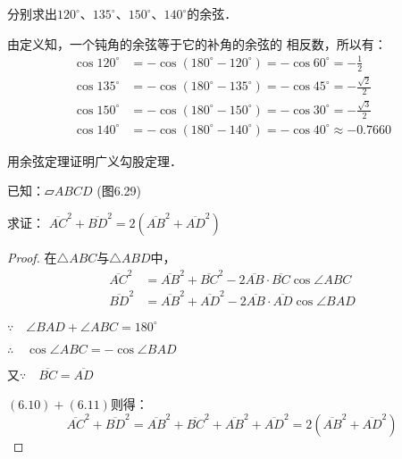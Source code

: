 \begin{example}
    分别求出$120^{\circ}$、$135^{\circ}$、$150^{\circ}$、$140^{\circ}$的余弦．
\end{example}

\begin{solution}
由定义知，一个钝角的余弦等于它的补角的余弦的
相反数，所以有：
\[\begin{split}
  \cos120^{\circ}&=-\cos(180^{\circ}-120^{\circ})=-\cos60^{\circ}=-\frac{1}{2}\\
  \cos135^{\circ}&=-\cos(180^{\circ}-135^{\circ})=-\cos45^{\circ}=-\frac{\sqrt{2}}{2}\\  
  \cos150^{\circ}&=-\cos(180^{\circ}-150^{\circ})=-\cos30^{\circ}=-
\frac{\sqrt{3}}{2}\\
\cos140^{\circ}&=-\cos(180^{\circ}-140^{\circ})=-\cos40^{\circ}\approx -0.7660  
\end{split}\]
\end{solution}

\begin{example}
    用余弦定理证明广义勾股定理．

    已知：$\parallelogram ABCD$ (图6.29)

    求证：
    $\overline{AC}^2+\overline{BD}^2=2(\overline{AB}^2+\overline{AD}^2)$
\end{example}

\begin{figure}[htp]
    \centering
{}
    \caption{}
\end{figure}

\begin{proof}
在$\triangle ABC$与$\triangle ABD$中，
\begin{align}
   \overline{AC}^2&=\overline{AB}^2+\overline{BC}^2-2\overline{AB}\cdot \overline{BC} \cos\angle ABC \\
    \overline{BD}^2&=\overline{AB}^2+\overline{AD}^2-2\overline{AB}\cdot \overline{AD}\cos\angle BAD
\end{align}

$\because\quad \angle BAD+\angle ABC =180^{\circ}$

$\therefore\quad \cos \angle ABC=-\cos\angle BAD$

又$\because\quad \overline{BC}=\overline{AD}$

$(6.10)+(6.11)$则得：
\[\overline{AC}^2+\overline{BD}^2=\overline{AB}^2+\overline{BC}^2+\overline{AB}^2+\overline{AD}^2=2\left(\overline{AB}^2+\overline{AD}^2\right)\]
\end{proof}

